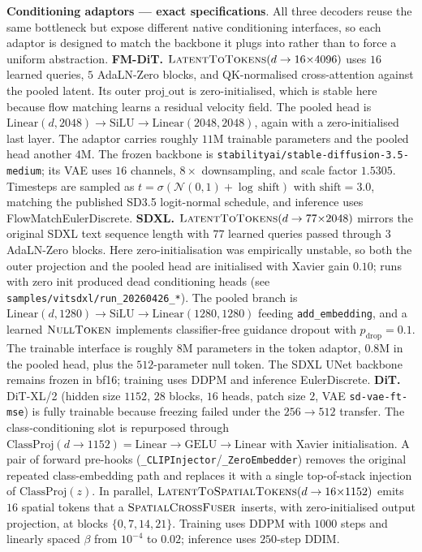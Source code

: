 \documentclass{article}
\begin{document}
\textbf{Conditioning adaptors --- exact specifications}. All three decoders reuse the same bottleneck but expose different native conditioning interfaces, so each adaptor is designed to match the backbone it plugs into rather than to force a uniform abstraction.
\textbf{FM-DiT.} $\textsc{LatentToTokens}(d \to 16{\times}4096)$ uses $16$ learned queries, $5$ AdaLN-Zero blocks, and QK-normalised cross-attention against the pooled latent. Its outer $\mathrm{proj\_out}$ is zero-initialised, which is stable here because flow matching learns a residual velocity field. The pooled head is $\mathrm{Linear}(d,2048)\to\mathrm{SiLU}\to\mathrm{Linear}(2048,2048)$, again with a zero-initialised last layer. The adaptor carries roughly $11$M trainable parameters and the pooled head another $4$M. The frozen backbone is \texttt{stabilityai/stable-diffusion-3.5-medium}; its VAE uses $16$ channels, $8{\times}$ downsampling, and scale factor $1.5305$. Timesteps are sampled as $t = \sigma(\mathcal{N}(0,1)+\log\,\mathrm{shift})$ with $\mathrm{shift}{=}3.0$, matching the published SD3.5 logit-normal schedule, and inference uses FlowMatchEulerDiscrete.
\textbf{SDXL.} $\textsc{LatentToTokens}(d \to 77{\times}2048)$ mirrors the original SDXL text sequence length with $77$ learned queries passed through $3$ AdaLN-Zero blocks. Here zero-initialisation was empirically unstable, so both the outer projection and the pooled head are initialised with Xavier gain $0.10$; runs with zero init produced dead conditioning heads (see \texttt{samples/vitsdxl/run\_20260426\_*}). The pooled branch is $\mathrm{Linear}(d,1280)\to\mathrm{SiLU}\to\mathrm{Linear}(1280,1280)$ feeding \texttt{add\_embedding}, and a learned $\textsc{NullToken}$ implements classifier-free guidance dropout with $p_{\mathrm{drop}}{=}0.1$. The trainable interface is roughly $8$M parameters in the token adaptor, $0.8$M in the pooled head, plus the $512$-parameter null token. The SDXL UNet backbone remains frozen in bf16; training uses DDPM and inference EulerDiscrete.
\textbf{DiT.} DiT-XL/2 (hidden size $1152$, $28$ blocks, $16$ heads, patch size $2$, VAE \texttt{sd-vae-ft-mse}) is fully trainable because freezing failed under the $256{\to}512$ transfer. The class-conditioning slot is repurposed through $\mathrm{ClassProj}(d \to 1152) = \mathrm{Linear}\to\mathrm{GELU}\to\mathrm{Linear}$ with Xavier initialisation. A pair of forward pre-hooks (\texttt{\_CLIPInjector}/\texttt{\_ZeroEmbedder}) removes the original repeated class-embedding path and replaces it with a single top-of-stack injection of $\mathrm{ClassProj}(z)$. In parallel, $\textsc{LatentToSpatialTokens}(d \to 16{\times}1152)$ emits $16$ spatial tokens that a $\textsc{SpatialCrossFuser}$ inserts, with zero-initialised output projection, at blocks $\{0,7,14,21\}$. Training uses DDPM with $1000$ steps and linearly spaced $\beta$ from $10^{-4}$ to $0.02$; inference uses $250$-step DDIM.
\end{document}
